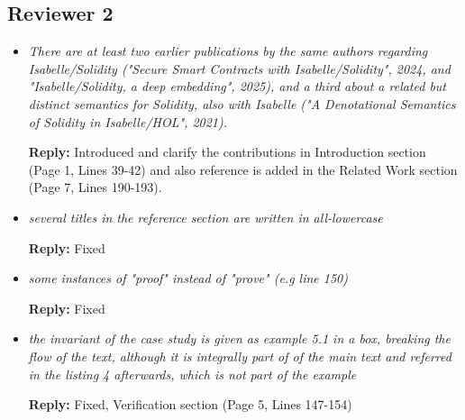 \documentclass[a4paper, 12pt] {article}
\begin{document}
\subsection{Reviewer 2}
\begin{itemize}
	\item \emph{There are at least two earlier publications by the same authors regarding Isabelle/Solidity ("Secure Smart Contracts with Isabelle/Solidity", 2024, and "Isabelle/Solidity, a deep embedding", 2025), and a third about a related but distinct semantics for Solidity, also with Isabelle ("A Denotational Semantics of Solidity in Isabelle/HOL", 2021). }
	
	
	\textbf{Reply:} Introduced and clarify the contributions in Introduction section (Page 1, Lines 39-42) and also reference is added in the Related Work section (Page 7, Lines 190-193).
	
	\item \emph{several titles in the reference section are written in all-lowercase }
	
	
	\textbf{Reply:} Fixed
	
  \item \emph{some instances of "proof" instead of "prove" (e.g line 150) }


\textbf{Reply:} Fixed


\item \emph{ the invariant of the case study is given as example 5.1 in a box, breaking the flow of the text, although it is integrally part of of the main text and referred in the listing 4 afterwards, which is not part of the example 
}

\textbf{Reply:}  Fixed, Verification section (Page 5, Lines 147-154)

\end{itemize}

\newpage
\end{document}
